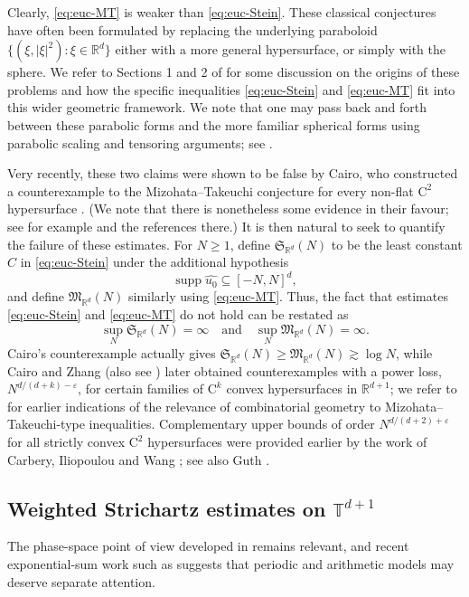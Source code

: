 \documentclass[11pt,reqno]{amsart}
\numberwithin{equation}{section}
\newcommand{\supp}{\operatorname{supp}}
\renewcommand{\geq}{\geqslant}
\renewcommand{\ge}{\geqslant}
\begin{document}
Clearly, \eqref{eq:euc-MT} is weaker than \eqref{eq:euc-Stein}.
These classical conjectures have often been formulated by replacing the underlying paraboloid $\{(\xi,|\xi|^2):\xi\in\mathbb{R}^d\}$ either with a more general hypersurface, or simply with the sphere. We refer to Sections 1 and 2 of \cite{BGNO} for some discussion on the origins of these problems and how the specific inequalities \eqref{eq:euc-Stein} and \eqref{eq:euc-MT} fit into this wider geometric framework. We note that one may pass back and forth between these parabolic forms and the more familiar spherical forms using parabolic scaling and tensoring arguments; see \cite{Ferrante}.

Very recently, these two claims were shown to be false by Cairo, who constructed a counterexample to the Mizohata--Takeuchi conjecture for every non-flat $\mathrm{C}^2$ hypersurface \cite{Cairo}. (We note that there is nonetheless some evidence in their favour; see for example \cite{Mul,BGNO} and the references there.)
It is then natural to seek to quantify the failure of these estimates. 
For $N\ge1$, define $\mathfrak{S}_{\mathbb{R}^d}(N)$ to be the least constant $C$ in \eqref{eq:euc-Stein} under the additional hypothesis
\[ \supp\widehat{u_0}\subseteq[-N,N]^d, \]
and define $\mathfrak{M}_{\mathbb{R}^d}(N)$ similarly using \eqref{eq:euc-MT}. Thus, the fact that estimates \eqref{eq:euc-Stein} and \eqref{eq:euc-MT} do not hold can be restated as 
\[ \sup_N\mathfrak{S}_{\mathbb{R}^d}(N)=\infty \quad\text{and}\quad \sup_N\mathfrak{M}_{\mathbb{R}^d}(N)=\infty. \]
Cairo's counterexample \cite{Cairo} actually gives $\mathfrak{S}_{\mathbb{R}^d}(N) \geq \mathfrak{M}_{\mathbb{R}^d}(N) \gtrsim \log N$, while Cairo and Zhang \cite{CairoZhang} (also see \cite{Fenves}) later obtained counterexamples with a power loss, $N^{d/(d+k)-\varepsilon}$, for certain families of $\mathrm{C}^k$ convex hypersurfaces in $\mathbb{R}^{d+1}$; we refer to \cite{Carbery09} for earlier indications of the relevance of combinatorial geometry to Mizohata--Takeuchi-type inequalities.
Complementary upper bounds of order $N^{d/(d+2)+\varepsilon}$ for all strictly convex $\mathrm{C}^2$ hypersurfaces were provided earlier by the work of Carbery, Iliopoulou and Wang \cite{CIW}; see also Guth \cite{Guthtalk}. 

\subsection{Weighted Strichartz estimates on \texorpdfstring{$\mathbb{T}^{d+1}$}{torus}}%
The phase-space point of view developed in \cite{BGNO} remains relevant, and recent exponential-sum work such as \cite{Yang} suggests that periodic and arithmetic models may deserve separate attention.
\end{document}
